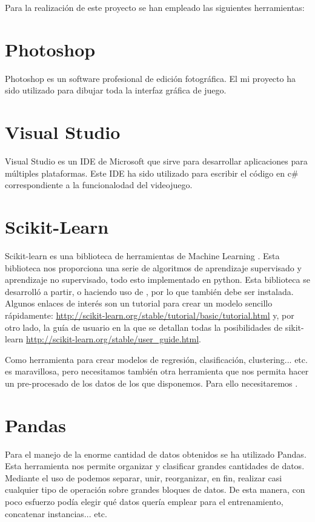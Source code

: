 
Para la realización de este proyecto se han empleado las siguientes herramientas:

\section{Photoshop}
Photoshop es un software profesional de edición fotográfica. El mi proyecto ha sido utilizado para dibujar toda la interfaz gráfica de juego.

\section{Visual Studio}
Visual Studio  es un IDE de Microsoft que sirve para desarrollar aplicaciones para múltiples plataformas. Este IDE ha sido utilizado para escribir el código en c# correspondiente a la funcionalodad del videojuego.

\section{Scikit-Learn}
 Scikit-learn es una biblioteca de herramientas de Machine Learning \cite{scikit}. Esta biblioteca nos proporciona una serie de algoritmos de aprendizaje supervisado y aprendizaje no supervisado, todo esto implementado en python. Esta biblioteca se desarrolló a partir, o haciendo uso de , por lo que también debe ser instalada. Algunos enlaces de interés son un tutorial para crear un modelo sencillo rápidamente: \url{http://scikit-learn.org/stable/tutorial/basic/tutorial.html} y, por otro lado, la guía de usuario en la que se detallan todas la posibilidades de sikit-learn \url{http://scikit-learn.org/stable/user_guide.html}.

Como herramienta para crear modelos de regresión, clasificación, clustering... etc. es maravillosa, pero necesitamos también otra herramienta que nos permita hacer un pre-procesado de los datos de los que disponemos. Para ello necesitaremos .

\section{Pandas}
Para el manejo de la enorme cantidad de datos obtenidos se ha utilizado Pandas. Esta herramienta nos permite organizar y clasificar grandes cantidades de datos\cite{mckinney-proc-scipy-2010, mckinney-proc-scipy-2011}. Mediante el uso de  podemos separar, unir, reorganizar, en fin, realizar casi cualquier tipo de operación sobre grandes bloques de datos. De esta manera, con poco esfuerzo podía elegir qué datos quería emplear para el entrenamiento, concatenar instancias... etc.

